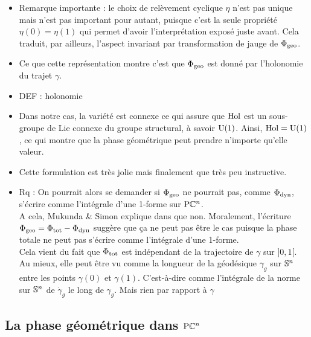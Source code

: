 \begin{itemize}
	\item Remarque importante : le choix de relèvement cyclique $\eta$ n'est pas unique mais n'est pas important pour autant, puisque c'est la seule propriété $\eta(0)=\eta(1)$ qui permet d'avoir l'interprétation exposé juste avant. Cela traduit, par ailleurs, l'aspect invariant par transformation de jauge de $\phaseg$.
	
	\item Ce que cette représentation montre c'est que $\phaseg$ est donné par l'holonomie du trajet $\gamma$.
	
	\item DEF : holonomie
	
		
	
	\item Dans notre cas, la variété est connexe ce qui assure que $\Hol$ est un sous-groupe de Lie connexe du groupe structural, à savoir $\U{1}$. Ainsi, $\Hol = \U{1}$, ce qui montre que la phase géométrique peut prendre n'importe qu'elle valeur.
	
	\item Cette formulation est très jolie mais finalement que très peu instructive. 
	
	\item Rq : On pourrait alors se demander si $\phaseg$ ne pourrait pas, comme $\phased$, s'écrire comme l'intégrale d'une 1-forme sur $\PC{n}$.
	\\
	A cela, Mukunda \& Simon explique dans \cite{mukunda_quantum_1993} que non. Moralement, l'écriture $\phaseg = \phaset - \phased$ suggère que ça ne peut pas être le cas puisque la phase totale ne peut pas s'écrire comme l'intégrale d'une 1-forme.
	\\
	
	 Cela vient du fait que $\phaset$ est indépendant de la trajectoire de $\gamma$ sur $]0,1[$. Au mieux, elle peut être vu comme la longueur de la géodésique $\gamma_g$ sur $\S{n}$ entre les points $\gamma(0)$ et $\gamma(1)$. C'est-à-dire comme l'intégrale de la norme sur $\S{n}$ de $\dot{\gamma}_g$ le long de $\gamma_g$. Mais rien par rapport à $\gamma$
	
\end{itemize}




\subsection{La phase géométrique dans $\PC{n}$}

